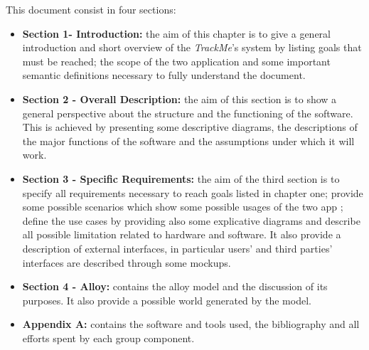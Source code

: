 This document consist in four sections:
\begin{itemize}
	\item \textbf{Section 1- Introduction:} the aim of this chapter is to give a general introduction and short overview of the 			\textit{TrackMe}'s system by listing goals that must be reached; the scope of the two application and some important semantic 		definitions necessary to fully understand the document.  
	\item \textbf{Section 2 - Overall Description:} the aim of this section is to show a general perspective about the structure and the 		functioning of the software. This is achieved by presenting some descriptive diagrams, the descriptions of the major functions of 		the software and the assumptions under which it will work.
	\item \textbf{Section 3 - Specific Requirements:} the aim of the third section is to specify all requirements necessary to reach 			goals listed in chapter one; provide some possible scenarios which show some possible usages of the two app ; define the use 			cases by providing also some explicative diagrams and describe all possible limitation related to hardware and software. It also 		provide a description of external interfaces, in particular users' and third parties' interfaces are described through some mockups.
	\item \textbf{Section 4 - Alloy:} contains the alloy model and the discussion of its purposes. It also provide a possible world 			generated by the model.
	\item \textbf{Appendix A:} contains the software and tools used, the bibliography and all efforts spent by each group component. 
\end{itemize}